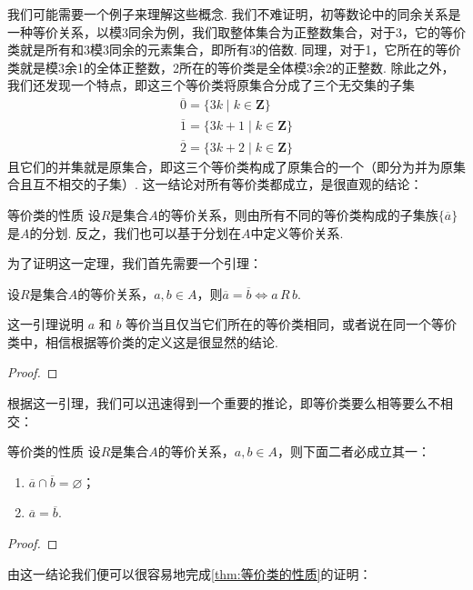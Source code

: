 我们可能需要一个例子来理解这些概念. 我们不难证明，初等数论中的同余关系是一种等价关系，以模3同余为例，我们取整体集合为正整数集合，对于3，它的等价类就是所有和3模3同余的元素集合，即所有3的倍数. 同理，对于1，它所在的等价类就是模3余1的全体正整数，2所在的等价类是全体模3余2的正整数. 除此之外，我们还发现一个特点，即这三个等价类将原集合分成了三个无交集的子集
\begin{gather*}
    \overline{0}=\{3k\mid k\in\mathbf{Z}\} \\
    \overline{1}=\{3k+1\mid k\in\mathbf{Z}\} \\
    \overline{2}=\{3k+2\mid k\in\mathbf{Z}\}
\end{gather*}
且它们的并集就是原集合，即这三个等价类构成了原集合的一个（即分为并为原集合且互不相交的子集）. 这一结论对所有等价类都成立，是很直观的结论：
\begin{theorem}{}{等价类的性质}
    设$R$是集合$A$的等价关系，则由所有不同的等价类构成的子集族$\{\overline{a}\}$是$A$的分划. 反之，我们也可以基于分划在$A$中定义等价关系.
\end{theorem}

为了证明这一定理，我们首先需要一个引理：
\begin{lemma}{}{}
    设$R$是集合$A$的等价关系，$a,b\in A$，则$\overline{a}=\overline{b}\iff a\,R\,b$.
\end{lemma}
这一引理说明 $a$ 和 $b$ 等价当且仅当它们所在的等价类相同，或者说在同一个等价类中，相信根据等价类的定义这是很显然的结论.

\begin{proof}

\end{proof}

根据这一引理，我们可以迅速得到一个重要的推论，即等价类要么相等要么不相交：
\begin{corollary}{}{等价类的性质}
    设$R$是集合$A$的等价关系，$a,b\in A$，则下面二者必成立其一：
    \begin{enumerate}
        \item $\overline{a}\cap\overline{b}=\varnothing$；

        \item $\overline{a}=\overline{b}$.
    \end{enumerate}
\end{corollary}

\begin{proof}

\end{proof}

由这一结论我们便可以很容易地完成\autoref{thm:等价类的性质}的证明：

